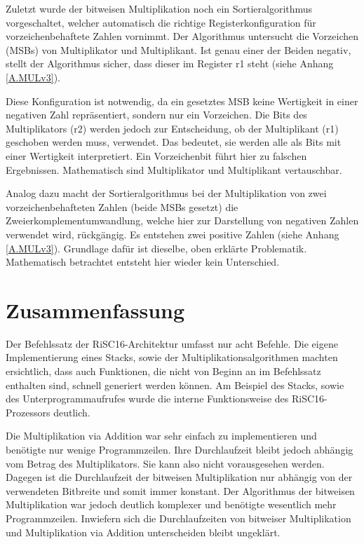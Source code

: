 \documentclass[fleqn, a4paper, 11pt]{article}       %
\begin{document}
Zuletzt wurde der bitweisen Multiplikation noch ein Sortieralgorithmus vorgeschaltet, welcher automatisch die richtige Registerkonfiguration für vorzeichenbehaftete Zahlen vornimmt. Der Algorithmus untersucht die Vorzeichen (MSBs) von Multiplikator und Multiplikant. Ist genau einer der Beiden negativ, stellt der Algorithmus sicher, dass dieser im Register r1 steht (siehe Anhang \ref{A.MULv3}). 

Diese Konfiguration ist notwendig, da ein gesetztes MSB keine Wertigkeit in einer negativen  Zahl repräsentiert, sondern nur ein Vorzeichen. Die Bits des Multiplikators (r2) werden jedoch zur Entscheidung, ob der Multiplikant (r1) geschoben werden muss, verwendet. Das bedeutet, sie werden alle als Bits mit einer Wertigkeit interpretiert. Ein Vorzeichenbit führt hier zu falschen Ergebnissen. Mathematisch sind Multiplikator und Multiplikant vertauschbar.

Analog dazu macht der Sortieralgorithmus bei der Multiplikation von zwei vorzeichenbehafteten Zahlen (beide MSBs gesetzt) die Zweierkomplementumwandlung, welche hier zur Darstellung von negativen Zahlen verwendet wird, rückgängig. Es entstehen zwei positive Zahlen (siehe Anhang \ref{A.MULv3}). Grundlage dafür ist dieselbe, oben erklärte Problematik. Mathematisch betrachtet entsteht hier wieder kein Unterschied.


\section{Zusammenfassung}

Der Befehlssatz der RiSC16-Architektur umfasst nur acht Befehle. Die eigene Implementierung eines Stacks, sowie der Multiplikationsalgorithmen machten ersichtlich, dass auch Funktionen, die nicht von Beginn an im Befehlssatz enthalten sind, schnell generiert werden können. Am Beispiel des Stacks, sowie des Unterprogrammaufrufes wurde die interne Funktionsweise des RiSC16-Prozessors deutlich.

Die Multiplikation via Addition war sehr einfach zu implementieren und benötigte nur wenige Programmzeilen. Ihre Durchlaufzeit bleibt jedoch abhängig vom Betrag des Multiplikators. Sie kann also nicht vorausgesehen werden. Dagegen ist die Durchlaufzeit der bitweisen Multiplikation nur abhängig von der verwendeten Bitbreite und somit immer konstant. Der Algorithmus der bitweisen Multiplikation war jedoch deutlich komplexer und benötigte wesentlich mehr Programmzeilen. Inwiefern sich die Durchlaufzeiten von bitweiser Multiplikation und Multiplikation via Addition unterscheiden bleibt ungeklärt.
\end{document}
